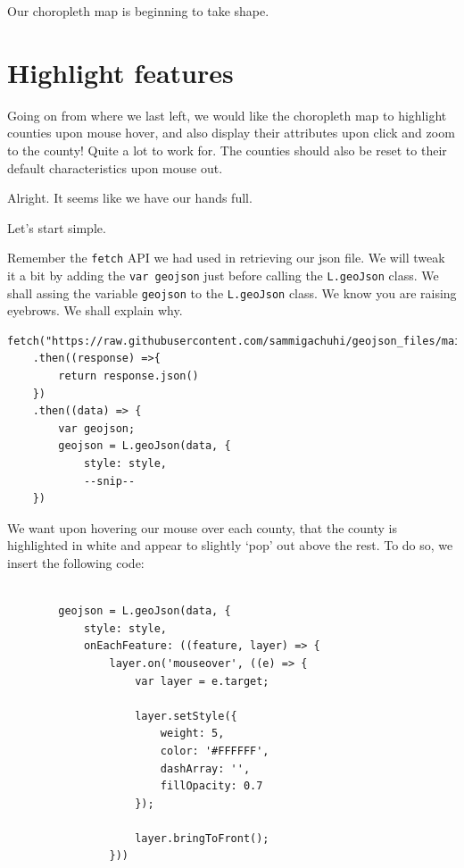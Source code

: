 \documentclass[
]{book}
\begin{document}
Our choropleth map is beginning to take shape.

\hypertarget{highlight-features}{%
\section{Highlight features}\label{highlight-features}}

Going on from where we last left, we would like the choropleth map to highlight counties upon mouse hover, and also display their attributes upon click and zoom to the county! Quite a lot to work for. The counties should also be reset to their default characteristics upon mouse out.

Alright. It seems like we have our hands full.

Let's start simple.

Remember the \texttt{fetch} API we had used in retrieving our json file. We will tweak it a bit by adding the \texttt{var\ geojson} just before calling the \texttt{L.geoJson} class. We shall assing the variable \texttt{geojson} to the \texttt{L.geoJson} class. We know you are raising eyebrows. We shall explain why.

\begin{verbatim}
fetch("https://raw.githubusercontent.com/sammigachuhi/geojson_files/main/counties_json.json")
    .then((response) =>{
        return response.json()
    })
    .then((data) => {
        var geojson;
        geojson = L.geoJson(data, {
            style: style,
            --snip--
    })
\end{verbatim}

We want upon hovering our mouse over each county, that the county is highlighted in white and appear to slightly `pop' out above the rest. To do so, we insert the following code:

\begin{verbatim}

        geojson = L.geoJson(data, {
            style: style,
            onEachFeature: ((feature, layer) => {
                layer.on('mouseover', ((e) => {
                    var layer = e.target;
                
                    layer.setStyle({
                        weight: 5,
                        color: '#FFFFFF',
                        dashArray: '',
                        fillOpacity: 0.7
                    });
                
                    layer.bringToFront();
                }))
                
                
\end{verbatim}
\end{document}
